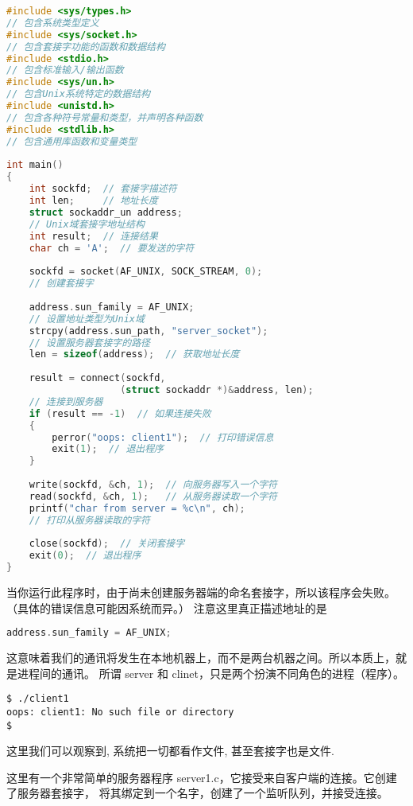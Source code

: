 \documentclass{ctexart}
\begin{document}
\begin{lstlisting}[language=C]  
#include <sys/types.h>   
// 包含系统类型定义  
#include <sys/socket.h>  
// 包含套接字功能的函数和数据结构  
#include <stdio.h>       
// 包含标准输入/输出函数  
#include <sys/un.h>      
// 包含Unix系统特定的数据结构  
#include <unistd.h>      
// 包含各种符号常量和类型，并声明各种函数  
#include <stdlib.h>      
// 包含通用库函数和变量类型  
      
int main()  
{  
    int sockfd;  // 套接字描述符  
    int len;     // 地址长度  
    struct sockaddr_un address;  
    // Unix域套接字地址结构  
    int result;  // 连接结果  
    char ch = 'A';  // 要发送的字符  
      
    sockfd = socket(AF_UNIX, SOCK_STREAM, 0);  
    // 创建套接字  
      
    address.sun_family = AF_UNIX;  
    // 设置地址类型为Unix域  
    strcpy(address.sun_path, "server_socket");  
    // 设置服务器套接字的路径  
    len = sizeof(address);  // 获取地址长度  
      
    result = connect(sockfd, 
                    (struct sockaddr *)&address, len);  
    // 连接到服务器  
    if (result == -1)  // 如果连接失败  
    {  
        perror("oops: client1");  // 打印错误信息  
        exit(1);  // 退出程序  
    }  
      
    write(sockfd, &ch, 1);  // 向服务器写入一个字符  
    read(sockfd, &ch, 1);   // 从服务器读取一个字符  
    printf("char from server = %c\n", ch);  
    // 打印从服务器读取的字符  
      
    close(sockfd);  // 关闭套接字  
    exit(0);  // 退出程序  
}  
\end{lstlisting}    

当你运行此程序时，由于尚未创建服务器端的命名套接字，所以该程序会失败。（具体的错误信息可能因系统而异。）  
注意这里真正描述地址的是
\begin{lstlisting}[language=C]
    address.sun_family = AF_UNIX;  
\end{lstlisting}
这意味着我们的通讯将发生在本地机器上，而不是两台机器之间。所以本质上，就是进程间的通讯。
所谓 server 和 clinet，只是两个扮演不同角色的进程（程序）。
  
\begin{verbatim}  
$ ./client1  
oops: client1: No such file or directory
$  
\end{verbatim}  

这里我们可以观察到, 系统把一切都看作文件, 甚至套接字也是文件.

这里有一个非常简单的服务器程序 server1.c，它接受来自客户端的连接。它创建了服务器套接字，
将其绑定到一个名字，创建了一个监听队列，并接受连接。
\end{document}
